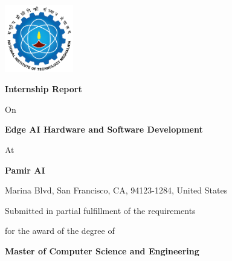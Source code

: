 \documentclass[12pt,a4paper]{report}
\begin{document}

\begin{titlepage}
    \centering

    \vspace*{1cm}

    \includegraphics[width=3cm]{nitm_logo.png}

    \vspace{1.5cm}

    {\LARGE\bfseries Internship Report}

    \vspace{1cm}

    {\Large On}

    \vspace{0.5cm}

    {\LARGE\bfseries Edge AI Hardware and Software Development}

    \vspace{1cm}

    {\Large At}

    \vspace{0.5cm}

    {\LARGE\bfseries Pamir AI}

    \vspace{0.3cm}

    {\large Marina Blvd, San Francisco, CA, 94123-1284, United States}

    \vspace{1.5cm}

    {\large Submitted in partial fulfillment of the requirements}

    {\large for the award of the degree of}

    \vspace{0.5cm}

    {\Large\bfseries Master of Computer Science and Engineering}

    \vspace{1cm}


\end{titlepage}
\end{document}
